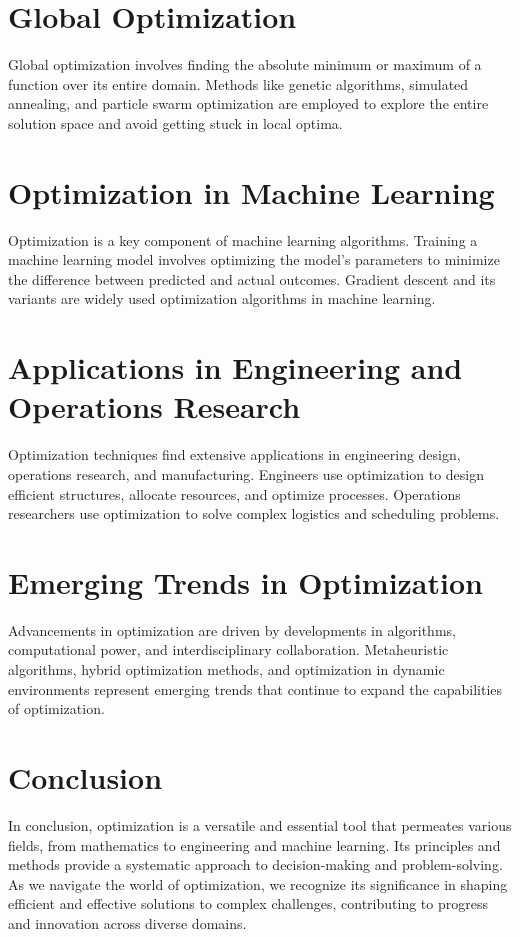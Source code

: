 \documentclass{article}
\begin{document}
\section*{Global Optimization}
Global optimization involves finding the absolute minimum or maximum of a function over its entire domain. Methods like genetic algorithms, simulated annealing, and particle swarm optimization are employed to explore the entire solution space and avoid getting stuck in local optima.

\section*{Optimization in Machine Learning}
Optimization is a key component of machine learning algorithms. Training a machine learning model involves optimizing the model's parameters to minimize the difference between predicted and actual outcomes. Gradient descent and its variants are widely used optimization algorithms in machine learning.

\section*{Applications in Engineering and Operations Research}
Optimization techniques find extensive applications in engineering design, operations research, and manufacturing. Engineers use optimization to design efficient structures, allocate resources, and optimize processes. Operations researchers use optimization to solve complex logistics and scheduling problems.

\section*{Emerging Trends in Optimization}
Advancements in optimization are driven by developments in algorithms, computational power, and interdisciplinary collaboration. Metaheuristic algorithms, hybrid optimization methods, and optimization in dynamic environments represent emerging trends that continue to expand the capabilities of optimization.

\section*{Conclusion}
In conclusion, optimization is a versatile and essential tool that permeates various fields, from mathematics to engineering and machine learning. Its principles and methods provide a systematic approach to decision-making and problem-solving. As we navigate the world of optimization, we recognize its significance in shaping efficient and effective solutions to complex challenges, contributing to progress and innovation across diverse domains.
\end{document}
